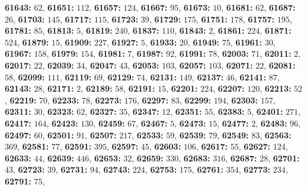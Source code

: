 \textsf{\bfseries 61643:} $62$, \textsf{\bfseries 61651:} $112$, \textsf{\bfseries 61657:} $124$, \textsf{\bfseries 61667:} $95$, \textsf{\bfseries 61673:} $10$, \textsf{\bfseries 61681:} $62$, \textsf{\bfseries 61687:} $26$, \textsf{\bfseries 61703:} $145$, \textsf{\bfseries 61717:} $115$, \textsf{\bfseries 61723:} $39$, \textsf{\bfseries 61729:} $175$, \textsf{\bfseries 61751:} $178$, \textsf{\bfseries 61757:} $195$, \textsf{\bfseries 61781:} $85$, \textsf{\bfseries 61813:} $5$, \textsf{\bfseries 61819:} $240$, \textsf{\bfseries 61837:} $110$, \textsf{\bfseries 61843:} $2$, \textsf{\bfseries 61861:} $224$, \textsf{\bfseries 61871:} $524$, \textsf{\bfseries 61879:} $15$, \textsf{\bfseries 61909:} $227$, \textsf{\bfseries 61927:} $5$, \textsf{\bfseries 61933:} $20$, \textsf{\bfseries 61949:} $75$, \textsf{\bfseries 61961:} $30$, \textsf{\bfseries 61967:} $158$, \textsf{\bfseries 61979:} $154$, \textsf{\bfseries 61981:} $7$, \textsf{\bfseries 61987:} $92$, \textsf{\bfseries 61991:} $78$, \textsf{\bfseries 62003:} $71$, \textsf{\bfseries 62011:} $2$, \textsf{\bfseries 62017:} $22$, \textsf{\bfseries 62039:} $34$, \textsf{\bfseries 62047:} $43$, \textsf{\bfseries 62053:} $103$, \textsf{\bfseries 62057:} $103$, \textsf{\bfseries 62071:} $22$, \textsf{\bfseries 62081:} $58$, \textsf{\bfseries 62099:} $111$, \textsf{\bfseries 62119:} $69$, \textsf{\bfseries 62129:} $74$, \textsf{\bfseries 62131:} $149$, \textsf{\bfseries 62137:} $46$, \textsf{\bfseries 62141:} $87$, \textsf{\bfseries 62143:} $28$, \textsf{\bfseries 62171:} $2$, \textsf{\bfseries 62189:} $58$, \textsf{\bfseries 62191:} $15$, \textsf{\bfseries 62201:} $224$, \textsf{\bfseries 62207:} $120$, \textsf{\bfseries 62213:} $52$, \textsf{\bfseries 62219:} $70$, \textsf{\bfseries 62233:} $78$, \textsf{\bfseries 62273:} $176$, \textsf{\bfseries 62297:} $83$, \textsf{\bfseries 62299:} $194$, \textsf{\bfseries 62303:} $157$, \textsf{\bfseries 62311:} $30$, \textsf{\bfseries 62323:} $62$, \textsf{\bfseries 62327:} $35$, \textsf{\bfseries 62347:} $12$, \textsf{\bfseries 62351:} $55$, \textsf{\bfseries 62383:} $5$, \textsf{\bfseries 62401:} $271$, \textsf{\bfseries 62417:} $164$, \textsf{\bfseries 62423:} $130$, \textsf{\bfseries 62459:} $67$, \textsf{\bfseries 62467:} $5$, \textsf{\bfseries 62473:} $15$, \textsf{\bfseries 62477:} $2$, \textsf{\bfseries 62483:} $96$, \textsf{\bfseries 62497:} $60$, \textsf{\bfseries 62501:} $91$, \textsf{\bfseries 62507:} $217$, \textsf{\bfseries 62533:} $59$, \textsf{\bfseries 62539:} $79$, \textsf{\bfseries 62549:} $83$, \textsf{\bfseries 62563:} $369$, \textsf{\bfseries 62581:} $77$, \textsf{\bfseries 62591:} $395$, \textsf{\bfseries 62597:} $45$, \textsf{\bfseries 62603:} $106$, \textsf{\bfseries 62617:} $55$, \textsf{\bfseries 62627:} $124$, \textsf{\bfseries 62633:} $44$, \textsf{\bfseries 62639:} $446$, \textsf{\bfseries 62653:} $32$, \textsf{\bfseries 62659:} $330$, \textsf{\bfseries 62683:} $316$, \textsf{\bfseries 62687:} $28$, \textsf{\bfseries 62701:} $43$, \textsf{\bfseries 62723:} $39$, \textsf{\bfseries 62731:} $94$, \textsf{\bfseries 62743:} $224$, \textsf{\bfseries 62753:} $175$, \textsf{\bfseries 62761:} $354$, \textsf{\bfseries 62773:} $234$, \textsf{\bfseries 62791:} $75$, 
